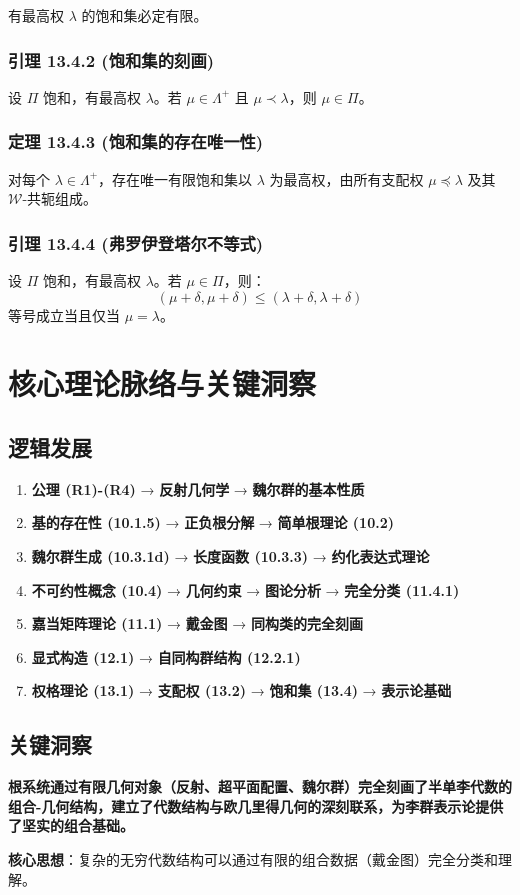 有最高权 $\lambda$ 的饱和集必定有限。

\subsubsection{引理 13.4.2 (饱和集的刻画)}

设 $\Pi$ 饱和，有最高权 $\lambda$。若 $\mu \in \Lambda^+$ 且 $\mu \prec \lambda$，则 $\mu \in \Pi$。

\subsubsection{定理 13.4.3 (饱和集的存在唯一性)}

对每个 $\lambda \in \Lambda^+$，存在唯一有限饱和集以 $\lambda$ 为最高权，由所有支配权 $\mu \preceq \lambda$ 及其 $\mathcal{W}$-共轭组成。

\subsubsection{引理 13.4.4 (弗罗伊登塔尔不等式)}

设 $\Pi$ 饱和，有最高权 $\lambda$。若 $\mu \in \Pi$，则：
\[
(\mu + \delta, \mu + \delta) \leq (\lambda + \delta, \lambda + \delta)
\]
等号成立当且仅当 $\mu = \lambda$。


\section{核心理论脉络与关键洞察}

\subsection{逻辑发展}

\begin{enumerate}
	\item \textbf{公理 (R1)-(R4)} → \textbf{反射几何学} → \textbf{魏尔群的基本性质}
	\item \textbf{基的存在性 (10.1.5)} → \textbf{正负根分解} → \textbf{简单根理论 (10.2)}
	\item \textbf{魏尔群生成 (10.3.1d)} → \textbf{长度函数 (10.3.3)} → \textbf{约化表达式理论}
	\item \textbf{不可约性概念 (10.4)} → \textbf{几何约束} → \textbf{图论分析} → \textbf{完全分类 (11.4.1)}
	\item \textbf{嘉当矩阵理论 (11.1)} → \textbf{戴金图} → \textbf{同构类的完全刻画}
	\item \textbf{显式构造 (12.1)} → \textbf{自同构群结构 (12.2.1)}
	\item \textbf{权格理论 (13.1)} → \textbf{支配权 (13.2)} → \textbf{饱和集 (13.4)} → \textbf{表示论基础}
\end{enumerate}

\subsection{关键洞察}

\textbf{根系统通过有限几何对象（反射、超平面配置、魏尔群）完全刻画了半单李代数的组合-几何结构，建立了代数结构与欧几里得几何的深刻联系，为李群表示论提供了坚实的组合基础。}

\textbf{核心思想}：复杂的无穷代数结构可以通过有限的组合数据（戴金图）完全分类和理解。
